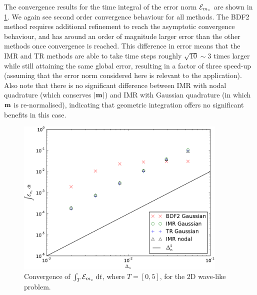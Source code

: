 The convergence results for the time integral of the error norm $\mathcal{E}_{m_z}$ are shown in \cref{fig:convergence-long-time-mz-norm}.
We again see second order convergence behaviour for all methods.
The BDF2 method requires additional refinement to reach the asymptotic convergence behaviour, and has around an order of magnitude larger error than the other methods once convergence is reached.
\label{cpu-correction-1}
This difference in error means that the IMR and TR methods are able to take time steps roughly $\sqrt{10} \sim 3$ times larger while still attaining the same global error, resulting in a factor of three speed-up (assuming that the error norm considered here is relevant to the application).
Also note that there is no significant difference between IMR with nodal quadrature (which conserves $\left|{\boldsymbol{\mathrm{m}}} \right|$) and IMR with Gaussian quadrature (in which $\boldsymbol{\mathrm{m}}$ is re-normalised), indicating that geometric integration offers no significant benefits in this case.
\begin{figure}
  \centering
  \includegraphics[width=0.9\textwidth]{plots/2d_wave_solution_convergence_long_time/auxerr1integralvsfakemeanofdts.pdf}
  \caption{Convergence of ${\int_T {\mathcal{E}_{m_z}} {\; \mathrm{{d}}} t}$, where $T=[0,5]$, for the 2D wave-like problem.
  }
  \label{fig:convergence-long-time-mz-norm}
\end{figure}

